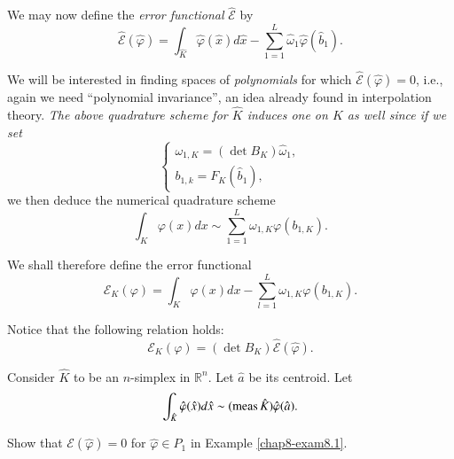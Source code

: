 We may now define the {\em error functional} $\hat{\mathscr{E}}$ by 
\begin{equation*}
\hat{\mathscr{E}}(\hat{\varphi})=\int_{\hat{K}}\hat{\varphi}(\hat{x})d\hat{x} - \sum^{L}_{1=1}\hat{\omega}_{1}\hat{\varphi}(\hat{b}_{1}).\tag{8.10}\label{chap8-eq8.10} 
\end{equation*}\pageoriginale

We will be interested in finding spaces of {\em polynomials} for which
$\hat{\mathscr{E}}(\hat{\varphi})=0$, i.e., again we need ``polynomial
invariance'', an idea already found in interpolation theory. {\em The
  above quadrature scheme for $\hat{K}$ induces one on $K$ as well
  since if we set}
\begin{equation*}
\begin{cases}
\omega_{1,K}=(\det B_{K})\hat{\omega}_{1},\\
b_{1,k}=F_{K}(\hat{b}_{1}),
\end{cases}\tag{8.11}\label{chap8-eq8.11}
\end{equation*}
we then deduce the numerical quadrature scheme
\begin{equation*}
\int_{K}\varphi(x)dx\sim
\sum^{L}_{1=1}\omega_{1,K}\varphi(b_{1,K}).\tag{8.12}\label{chap8-eq8.12} 
\end{equation*}

We shall therefore define the error functional
\begin{equation*}
\mathscr{E}_{K}(\varphi)=\int_{K}\varphi(x)dx-\sum^{L}_{l=1}\omega_{1,K}\varphi(b_{1,K}).\tag{8.13}\label{chap8-eq8.13}  
\end{equation*}

Notice that the following relation holds:
\begin{equation*}
\mathscr{E}_{K}(\varphi)=(\det
B_{K})\hat{\mathscr{E}}(\hat{\varphi}).\tag{8.14}\label{chap8-eq8.14} 
\end{equation*}

\begin{example}\label{chap8-exam8.1}
Consider $\hat{K}$ to be an $n$-simplex in $\mathbb{R}^{n}$. Let
$\hat{a}$ be its centroid. Let
$$
\int_{\hat{K}}\hat{\varphi}(\hat{x})d\hat{x}\sim(\operatorname{meas}
\hat{K})\hat{\varphi}(\hat{a}). 
$$
\end{example}

\begin{exercise}\label{chap8-exer8.1}
Show that $\mathscr{E}(\hat{\varphi})=0$ for $\hat{\varphi}\in P_{1}$
in Example \ref{chap8-exam8.1}. 
\end{exercise}

